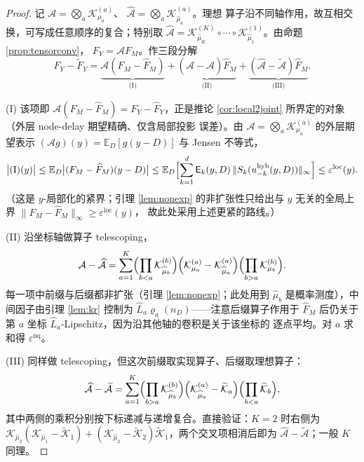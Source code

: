\documentclass[a4paper,11pt]{article}
\theoremstyle{definition}
\newcommand{\E}{\mathbb E}
\newcommand{\1}{\mathbf 1}
\newcommand{\Eerr}{\mathsf E}
\begin{document}
\begin{proof}
记 $\mathcal A=\bigotimes_a\mathcal K_{\mu_a}^{(a)}$、
$\widehat{\mathcal A}=\bigotimes_a\mathcal K_{\widehat\mu_a}^{(a)}$。理想
算子沿不同轴作用，故互相交换，可写成任意顺序的复合；特别取
$\widehat{\mathcal A}=\mathcal K_{\widehat\mu_K}^{(K)}\circ\cdots\circ
\mathcal K_{\widehat\mu_1}^{(1)}$。由命题 \ref{prop:tensorconv}，
$F_Y=\mathcal AF_M$。作三段分解
\[
F_Y-\widetilde F_Y
=
\underbrace{\mathcal A(F_M-\widehat F_M)}_{\text{(I)}}
+
\underbrace{(\mathcal A-\widehat{\mathcal A})\widehat F_M}_{\text{(II)}}
+
\underbrace{(\widehat{\mathcal A}-\widetilde{\mathcal A})\widehat F_M}
_{\text{(III)}} .
\]

(I) 该项即 $\mathcal A(F_M-\widehat F_M)=F_Y-\widehat F_Y$，正是推论
\ref{cor:local2joint} 所界定的对象（外层 node-delay 期望精确、仅含局部投影
误差）。由 $\mathcal A=\bigotimes_a\mathcal K_{\mu_a}^{(a)}$ 的外层期望表示
$(\mathcal A g)(y)=\E_D[g(y-D)]$ 与 Jensen 不等式，
\[
\bigl|(\mathrm{I})(y)\bigr|
\le\E_D\bigl|(F_M-\widehat F_M)(y-D)\bigr|
\le\E_D\Bigl[\sum_{k=1}^{d}\Eerr_k(y,D)\,\|S_k(u_{-k}^{\mathrm{hyb}}(y,D))\|_\infty\Bigr]
\le\varepsilon^{\mathrm{loc}}(y).
\]
（这是 $y$-局部化的紧界；引理 \ref{lem:nonexp} 的非扩张性只给出与 $y$
无关的全局上界 $\|F_M-\widehat F_M\|_\infty\ge\varepsilon^{\mathrm{loc}}(y)$，
故此处采用上述更紧的路线。）

(II) 沿坐标轴做算子 telescoping，
\[
\mathcal A-\widehat{\mathcal A}
=
\sum_{a=1}^{K}
\Bigl(\prod_{b<a}\mathcal K_{\widehat\mu_b}^{(b)}\Bigr)
\Bigl(\mathcal K_{\mu_a}^{(a)}-\mathcal K_{\widehat\mu_a}^{(a)}\Bigr)
\Bigl(\prod_{b>a}\mathcal K_{\mu_b}^{(b)}\Bigr).
\]
每一项中前缀与后缀都非扩张（引理 \ref{lem:nonexp}；此处用到
$\widehat\mu_b$ 是概率测度），中间因子由引理 \ref{lem:kr} 控制为
$\widehat L_a\varrho_a(n_D)$——注意后缀算子作用于 $\widehat F_M$ 后仍关于
第 $a$ 坐标 $\widehat L_a$-Lipschitz，因为沿其他轴的卷积是关于该坐标的
逐点平均。对 $a$ 求和得 $\varepsilon^{\mathrm{nq}}$。

(III) 同样做 telescoping，但这次前缀取实现算子、后缀取理想算子：
\[
\widehat{\mathcal A}-\widetilde{\mathcal A}
=
\sum_{a=1}^{K}
\Bigl(\prod_{b>a}\mathcal K_{\widehat\mu_b}^{(b)}\Bigr)
\Bigl(\mathcal K_{\widehat\mu_a}^{(a)}-\widetilde{\mathcal K}_a\Bigr)
\Bigl(\prod_{b<a}\widetilde{\mathcal K}_b\Bigr),
\]
其中两侧的乘积分别按下标递减与递增复合。直接验证：$K=2$ 时右侧为
$\mathcal K_{\widehat\mu_2}(\mathcal K_{\widehat\mu_1}-\widetilde{\mathcal
K}_1)+(\mathcal K_{\widehat\mu_2}-\widetilde{\mathcal K}_2)\widetilde{\mathcal
K}_1$，两个交叉项相消后即为
$\widehat{\mathcal A}-\widetilde{\mathcal A}$；一般 $K$ 同理。


\end{proof}
\end{document}
